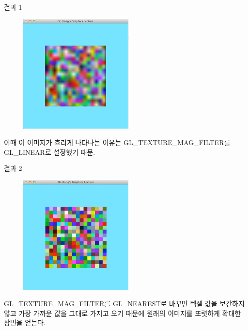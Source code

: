 \documentclass{beamer}
\begin{document}
\begin{frame}[fragile]{결과 1}

\begin{figure}[h!]
  \centering
	\includegraphics[height=6cm]{OGL_texture/texMap1.png}
\end{figure}


이때 이 이미지가 흐리게 나타나는 이유는 {\sf GL\_TEXTURE\_MAG\_FILTER}를 {\sf GL\_LINEAR}로 
설정했기 때문.


\end{frame}


\begin{frame}[fragile]{결과 2}

\begin{figure}[h!]
  \centering
	\includegraphics[height=6cm]{OGL_texture/texMap2.png}
\end{figure}

 {\sf GL\_TEXTURE\_MAG\_FILTER}를 {\sf GL\_NEAREST}로 바꾸면 텍셀 값을 보간하지 않고 가장 가까운 값을 그대로 가지고 오기 때문에
원래의 이미지를 또렷하게 확대한 장면을 얻는다.


\end{frame}
\end{document}
